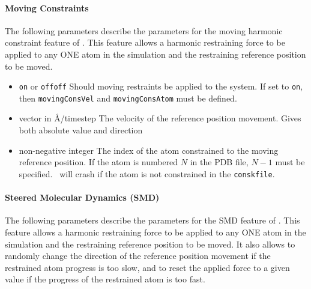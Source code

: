 \paragraph*{Moving Constraints}
The following parameters describe the parameters for the 
moving harmonic constraint feature of \NAMD.  
This feature allows a harmonic restraining force to be applied
to any ONE atom in the simulation and the restraining reference
position to be moved.


\begin{itemize}

\item 
{}
{\verb!on! or \verb!off!}{\verb!off!}
{Should moving restraints be applied to the system. If set 
to \verb!on!, then  \verb!movingConsVel! and \verb!movingConsAtom!
must be defined.}

\item
{}
{vector in \AA/timestep}
{The velocity of the reference position movement. Gives both absolute
value and direction}

\item
{}
{non-negative integer}
{The index of the atom constrained to the moving reference position. 
If the atom is numbered $N$ in the PDB file, $N-1$ must be specified.
\NAMD\ will crash if the atom is not constrained in the
\verb!conskfile!.
}

\end{itemize}

\paragraph*{Steered Molecular Dynamics (SMD)}
The following parameters describe the parameters for the 
SMD feature of \NAMD.
This feature allows a harmonic restraining force to be applied
to any ONE atom in the simulation and the restraining reference
position to be moved. It also allows to randomly change the direction
of the reference position movement if the restrained atom progress is
too slow, and to reset the applied force to a given value if the
progress of the restrained atom is too fast.

